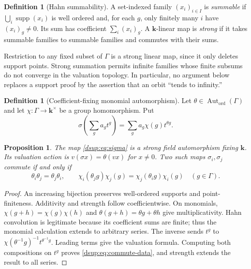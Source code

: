 \documentclass[11pt,oneside]{article}
\numberwithin{equation}{section}
\newtheorem{proposition}[theorem]{Proposition}
\theoremstyle{definition}
\newtheorem{definition}[theorem]{Definition}
\theoremstyle{remark}
\newcommand{\kk}{\mathbf k}
\newcommand{\supp}{\operatorname{supp}}
\newcommand{\Aut}{\operatorname{Aut}}
\begin{document}
\begin{definition}[Hahn summability]
A set-indexed family $(x_i)_{i\in I}$ is \emph{summable} if
$\bigcup_i\supp(x_i)$ is well ordered and, for each $g$, only finitely many
$i$ have $(x_i)_g\ne0$. Its sum has coefficient
$\sum_i(x_i)_g$. A $\kk$-linear map is \emph{strong} if it takes summable
families to summable families and commutes with their sums.
\end{definition}

Restriction to any fixed subset of $\Gamma$ is a strong linear map, since
it only deletes support points. Strong summation permits infinite families
whose finite subsums do not converge in the valuation topology. In
particular, no argument below replaces a support proof by the assertion
that an orbit ``tends to infinity.''

\begin{definition}[Coefficient-fixing monomial automorphism]
Let $\theta\in\Aut_{\mathrm{ord}}(\Gamma)$ and let
$\chi:\Gamma\to\kk^\times$ be a group homomorphism. Put
\begin{equation}\label{dsup:eq:sigma}
 \sigma\left(\sum_g a_gt^g\right)
   =\sum_g a_g\chi(g)t^{\theta g}.
\end{equation}
\end{definition}

\begin{proposition}\label{dsup:prop:monomial}
The map \eqref{dsup:eq:sigma} is a strong field automorphism fixing $\kk$.
Its valuation action is $v(\sigma x)=\theta(vx)$ for $x\ne0$. Two such
maps $\sigma_i,\sigma_j$ commute if and only if
\begin{equation}\label{dsup:eq:commute-data}
 \theta_i\theta_j=\theta_j\theta_i,\qquad
 \chi_i(\theta_jg)\chi_j(g)=\chi_j(\theta_i g)\chi_i(g)
 \quad(g\in\Gamma).
\end{equation}
\end{proposition}
\begin{proof}
An increasing bijection preserves well-ordered supports and point-finiteness.
Additivity and strength follow coefficientwise. On monomials,
$\chi(g+h)=\chi(g)\chi(h)$ and $\theta(g+h)=\theta g+\theta h$ give
multiplicativity. Hahn convolution is legitimate because its coefficient
sums are finite; thus the monomial calculation extends to arbitrary
series. The inverse sends $t^g$ to
$\chi(\theta^{-1}g)^{-1}t^{\theta^{-1}g}$. Leading terms give the valuation
formula. Computing both compositions on $t^g$ proves
\eqref{dsup:eq:commute-data}, and strength extends the result to all series.
\end{proof}
\end{document}
